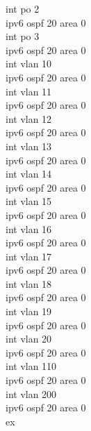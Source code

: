 \documentclass[a4paper, 12pt]{article}
\begin{document}
\begin{itemize}
\begin{itemize}
\begin{itemize}
{                        int po 2\\
                        ipv6 ospf 20 area 0\\
                        int po 3\\
                        ipv6 ospf 20 area 0\\
                        int vlan 10\\
                        ipv6 ospf 20 area 0\\
                        int vlan 11\\
                        ipv6 ospf 20 area 0\\
                        int vlan 12\\
                        ipv6 ospf 20 area 0\\
                        int vlan 13\\
                        ipv6 ospf 20 area 0\\
                        int vlan 14\\
                        ipv6 ospf 20 area 0\\
                        int vlan 15\\
                        ipv6 ospf 20 area 0\\
                        int vlan 16\\
                        ipv6 ospf 20 area 0\\
                        int vlan 17\\
                        ipv6 ospf 20 area 0\\
                        int vlan 18\\
                        ipv6 ospf 20 area 0\\
                        int vlan 19\\
                        ipv6 ospf 20 area 0\\
                        int vlan 20\\
                        ipv6 ospf 20 area 0\\
                        int vlan 110\\
                        ipv6 ospf 20 area 0\\
                        int vlan 200\\
                        ipv6 ospf 20 area 0\\
                        ex\\}
        
          \end{itemize}
       \end{itemize}
      
\end{itemize}
\end{document}
